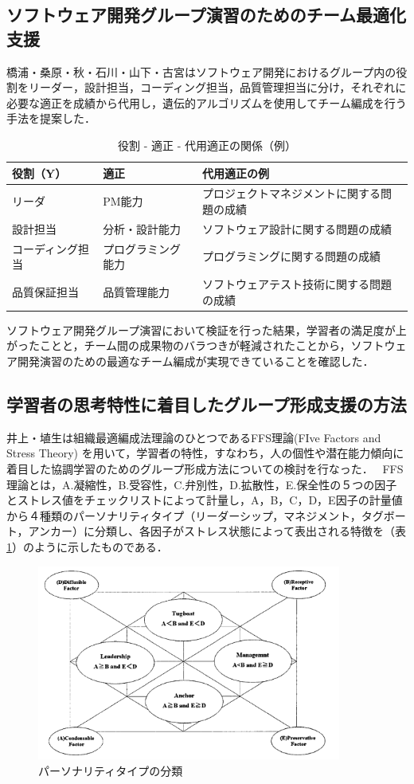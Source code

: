 \documentclass{funthesis}
\begin{document}
\subsection{ソフトウェア開発グループ演習のためのチーム最適化支援}
橋浦・桑原・秋・石川・山下・古宮\cite{A6}はソフトウェア開発におけるグループ内の役割をリーダー，設計担当，コーディング担当，品質管理担当に分け，それぞれに必要な適正を成績から代用し，遺伝的アルゴリズムを使用してチーム編成を行う手法を提案した．
\begin{table}[h]
\begin{center}
  \caption{役割 - 適正 - 代用適正の関係（例）}
  \begin{tabular}{lll} \hline
    役割（Y） & 適正 & 代用適正の例\tabularnewline \hline
    リーダ & PM能力 & プロジェクトマネジメントに関する問題の成績\tabularnewline
    設計担当 &分析・設計能力 & 
    ソフトウェア設計に関する問題の成績\tabularnewline
    コーディング担当&プログラミング能力 &
    プログラミングに関する問題の成績\tabularnewline
    品質保証担当&品質管理能力 &
    ソフトウェアテスト技術に関する問題の成績\tabularnewline
    \hline
  \end{tabular}

  \label{適正}
  \end{center}
\end{table}
ソフトウェア開発グループ演習において検証を行った結果，学習者の満足度が上がったことと，チーム間の成果物のバラつきが軽減されたことから，ソフトウェア開発演習のための最適なチーム編成が実現できていることを確認した．


\subsection{学習者の思考特性に着目したグループ形成支援の方法}
井上・埴生は\cite{A7}組織最適編成法理論のひとつであるFFS理論(FIve Factors and Stress Theory)
\cite{A8}を用いて，学習者の特性，すなわち，人の個性や潜在能力傾向に着目した協調学習のためのグループ形成方法についての検討を行なった．
\ FFS理論とは，A.凝縮性，B.受容性，C.弁別性，D.拡散性，E.保全性の５つの因子とストレス値をチェックリストによって計量し，A，B，C，D，E因子の計量値から４種類のパーソナリティタイプ（リーダーシップ，マネジメント，タグボート，アンカー）に分類し、各因子がストレス状態によって表出される特徴を（表\ref{FFS}）のように示したものである\cite{A9}．
\begin{figure}[h]
 \centering
   \includegraphics[width=100mm]{figures/FFS.png}
 \caption{パーソナリティタイプの分類}
 \label{FFS}
\end{figure}
\end{document}
